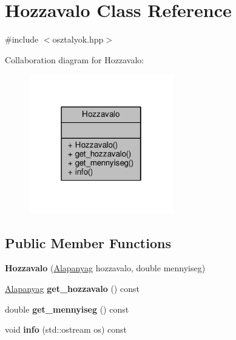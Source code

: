 \hypertarget{class_hozzavalo}{}\section{Hozzavalo Class Reference}
\label{class_hozzavalo}


{\ttfamily \#include $<$osztalyok.\+hpp$>$}



Collaboration diagram for Hozzavalo\+:
\nopagebreak
\begin{figure}[H]
\begin{center}
\leavevmode
\includegraphics[width=178pt]{class_hozzavalo__coll__graph}
\end{center}
\end{figure}
\subsection*{Public Member Functions}
\begin{DoxyCompactItemize}
\item 
{\bfseries Hozzavalo} (\hyperlink{class_alapanyag}{Alapanyag} hozzavalo, double mennyiseg)\hypertarget{class_hozzavalo_a616fae4cb079c68990413ecd8c8b97a6}{}\label{class_hozzavalo_a616fae4cb079c68990413ecd8c8b97a6}

\item 
\hyperlink{class_alapanyag}{Alapanyag} {\bfseries get\+\_\+hozzavalo} () const \hypertarget{class_hozzavalo_adcb8f8c51e9ec20c3e106846b2143c3a}{}\label{class_hozzavalo_adcb8f8c51e9ec20c3e106846b2143c3a}

\item 
double {\bfseries get\+\_\+mennyiseg} () const \hypertarget{class_hozzavalo_a750b741dfbbdcf1d54476c1d124f736c}{}\label{class_hozzavalo_a750b741dfbbdcf1d54476c1d124f736c}

\item 
void {\bfseries info} (std\+::ostream os) const \hypertarget{class_hozzavalo_aee49a4ae7c61f37d1bfee9d5115db4ff}{}\label{class_hozzavalo_aee49a4ae7c61f37d1bfee9d5115db4ff}

\end{DoxyCompactItemize}


